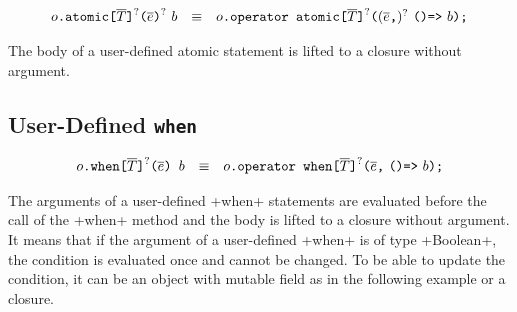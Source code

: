$$
\begin{array}{rcl}
  {o}\texttt{.atomic}\texttt{[}{\overline{T}}\texttt{]}^?\texttt{(}{\overline{e}}\texttt{)}^?~{b}
  & \equiv &
  {o}\texttt{.operator~atomic}\texttt{[}{\overline{T}}\texttt{]}^?\texttt{(} ({\overline{e}}\texttt{,})^?~ \texttt{()=>}~{b}\texttt{);}
\end{array}
$$

The body of a user-defined atomic statement is lifted to a closure without argument.

\subsection{User-Defined \texttt{when}}

$$
\begin{array}{rcl}
    {o}\texttt{.when}\texttt{[}{\overline{T}}\texttt{]}^?\texttt{(}{\overline{e}}\texttt{)~}{b}
    & \equiv &
    {o}\texttt{.operator~when}\texttt{[}{\overline{T}}\texttt{]}^?\texttt{(} {\overline{e}}\texttt{,}~ \texttt{()=>}~{b}\texttt{);}
\end{array}
$$

The arguments of a user-defined \xcd+when+ statements are evaluated
before the call of the \xcd+when+ method and the body is lifted to a
closure without argument. It means that if the argument of a
user-defined \xcd+when+ is of type \xcd+Boolean+, the condition is
evaluated once and cannot be changed. To be able to update the
condition, it can be an object with mutable field as in the following
example or a closure.


